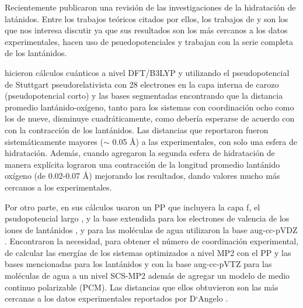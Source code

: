 Recientemente \cite{Dang2012} publicaron una revisi\'on de las 
investigaciones de la hidrataci\'on de lat\'anidos. Entre los 
trabajos te\'oricos citados por ellos, los trabajos de 
\cite{Ciup2010} y \cite{Kuta2010} son los que nos interesa discutir 
ya que sus resultados son los m\'as cercanos a los datos 
experimentales, hacen uso de psuedopotenciales y trabajan con la 
serie completa de los lant\'anidos.

\cite{Kuta2010} hicieron c\'alculos cu\'anticos a nivel DFT/B3LYP y
utilizando el pseudopotencial de Stuttgart pseudorelativista con 28 
electrones en la capa interna de carozo (pseudopotencial corto) 
\citep{Cao2001} y las bases segmentadas %
\citep{Cao2002} encontrando que la distancia promedio 
lant\'anido-ox\'igeno, tanto para los sistemas con coordinaci\'on 
ocho como los de nueve, disminuye cuadr\'aticamente, como deber\'ia 
esperarse de acuerdo con con la contracci\'on de los lant\'anidos. 
Las distancias que reportaron fueron sistem\'aticamente mayores 
($\sim$ 0.05 \AA) a las experimentales, con solo una esfera de 
hidrataci\'on. Adem\'as, cuando agregaron la segunda esfera de 
hidrataci\'on de manera expl\'icita lograron una contracci\'on de la 
longitud promedio lant\'anido ox\'igeno (de 0.02-0.07 \AA) mejorando 
los resultados, dando valores mucho m\'as cercanos a los 
experimentales.

Por otro parte, \cite{Ciup2010} en sus c\'alculos usaron un PP 
que incluyera la capa f, el psudopotencial largo \citep{Dolg1989}, y 
la base extendida para los electrones de valencia de los iones de 
lant\'anidos \citep{Yang2005}, %
y para las mol\'eculas de agua utilizaron la base aug-cc-pVDZ 
\citep{Dunn1989}. Encontraron la necesidad, para obtener el n\'umero 
de coordinaci\'on experimental, de calcular las energ\'ias de los 
sistemas optimizados a nivel MP2 con el PP y las bases mencionadas 
para los lant\'anidos y con la base aug-cc-pVTZ para las mol\'eculas 
de agua a un nivel SCS-MP2 \citep{Grim2003} adem\'as de agregar un 
modelo de medio continuo polarizable (PCM). Las distancias que ellos 
obtuvieron son las m\'as cercanas a los datos experimentales 
reportados por D`Angelo \citep{Dang2012}.

